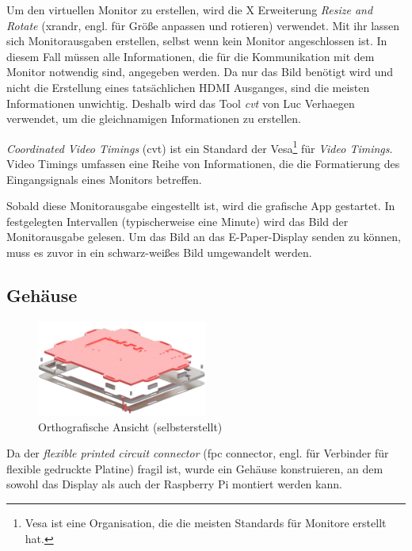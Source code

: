 \documentclass[10pt]{article}
\begin{document}
Um den virtuellen Monitor zu erstellen, wird die X Erweiterung \textit{Resize and Rotate} (xrandr, engl. für Größe anpassen und rotieren) verwendet. Mit ihr lassen sich Monitorausgaben erstellen, selbst wenn kein Monitor angeschlossen ist. In diesem Fall müssen alle Informationen, die für die Kommunikation mit dem Monitor notwendig sind, angegeben werden. Da nur das Bild benötigt wird und nicht die Erstellung eines tatsächlichen HDMI Ausganges, sind die meisten Informationen unwichtig. Deshalb wird das Tool \textit{cvt} von Luc Verhaegen verwendet, um die gleichnamigen Informationen zu erstellen. 

\textit{Coordinated Video Timings} (cvt) ist ein Standard der Vesa\footnote{Vesa ist eine Organisation, die die meisten Standards für Monitore erstellt hat.} für \textit{Video Timings}. Video Timings umfassen eine Reihe von Informationen, die die Formatierung des Eingangsignals eines Monitors betreffen.

Sobald diese Monitorausgabe eingestellt ist, wird die grafische App gestartet. In festgelegten Intervallen (typischerweise eine Minute) wird das Bild der Monitorausgabe gelesen. Um das Bild an das E-Paper-Display senden zu können, muss es zuvor in ein schwarz-weißes Bild umgewandelt werden.

\clearpage
\subsection{Gehäuse}
\begin{figure}
  \centering 
  \includegraphics[width=0.5\textwidth]{gehaeuse.jpg}
  \caption{Orthografische Ansicht (selbsterstellt)}
  \label{gehaeuse}
\end{figure}
Da der \textit{flexible printed circuit connector} (fpc connector, engl. für Verbinder für flexible gedruckte Platine) fragil ist, wurde ein Gehäuse konstruieren, an dem sowohl das Display als auch der Raspberry Pi montiert werden kann.  %
\end{document}
